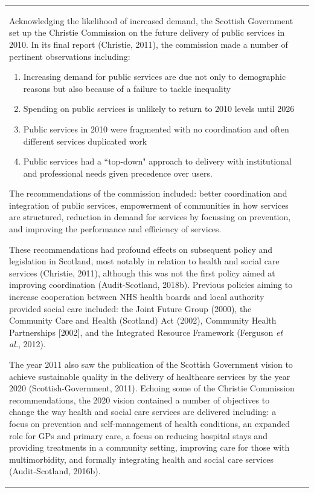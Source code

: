 \documentclass[12pt,a4paper,oneside,table]{report}
\begin{document}
\begin{tabular}[t]{ll}
Acknowledging the likelihood of increased demand, the Scottish
Government set up the Christie Commission on the future delivery of
public services in 2010. In its final report (Christie, 2011), the
commission made a number of pertinent observations including:

\begin{enumerate}[noitemsep, label={\alph*)}]
\item Increasing demand for public services are due not only to demographic reasons but also because of a failure to tackle inequality
\item Spending on public services is unlikely to return to 2010 levels until 2026
\item Public services in 2010 were fragmented with no coordination and often different services duplicated work
\item Public services had a ``top-down" approach to delivery with institutional and professional needs given precedence over users.
\end{enumerate}

The recommendations of the commission included: better coordination and
integration of public services, empowerment of communities in how
services are structured, reduction in demand for services by focussing
on prevention, and improving the performance and efficiency of services.

These recommendations had profound effects on subsequent policy and
legislation in Scotland, most notably in relation to health and social
care services (Christie, 2011), although this was not the first policy
aimed at improving coordination (Audit-Scotland, 2018b). Previous
policies aiming to increase cooperation between NHS health boards and
local authority provided social care included: the Joint Future Group
(2000), the Community Care and Health (Scotland) Act (2002), Community
Health Partnerships {[}2002{]}, and the Integrated Resource Framework
(Ferguson \emph{et al.}, 2012).

The year 2011 also saw the publication of the Scottish Government vision
to achieve sustainable quality in the delivery of healthcare services by
the year 2020 (Scottish-Government, 2011). Echoing some of the Christie
Commission recommendations, the 2020 vision contained a number of
objectives to change the way health and social care services are
delivered including: a focus on prevention and self-management of health
conditions, an expanded role for GPs and primary care, a focus on
reducing hospital stays and providing treatments in a community setting,
improving care for those with multimorbidity, and formally integrating
health and social care services (Audit-Scotland, 2016b).


\end{tabular}
\end{document}
